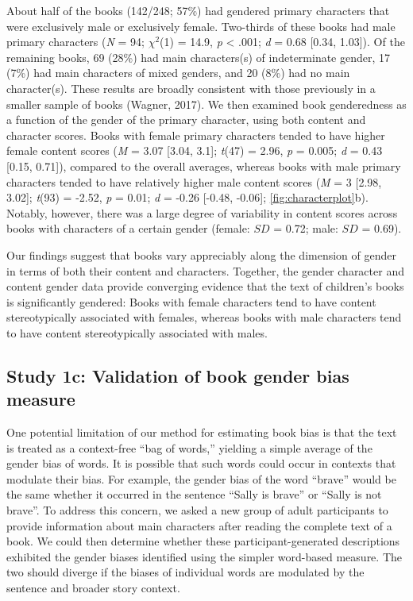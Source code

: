 \documentclass[
  english,
  ,man,floatsintext]{apa6}
\begin{document}
About half of the books (142/248; 57\%) had gendered primary characters that were exclusively male or exclusively female. Two-thirds of these books had male primary characters (\emph{N} = 94; \(\chi^2\)(1) = 14.9, \emph{p} \textless{} .001; \emph{d} = 0.68 {[}0.34, 1.03{]}). Of the remaining books, 69 (28\%) had main characters(s) of indeterminate gender, 17 (7\%) had main characters of mixed genders, and 20 (8\%) had no main character(s). These results are broadly consistent with those previously in a smaller sample of books (Wagner, 2017). We then examined book genderedness as a function of the gender of the primary character, using both content and character scores. Books with female primary characters tended to have higher female content scores (\emph{M} = 3.07 {[}3.04, 3.1{]}; \emph{t}(47) = 2.96, \emph{p} = 0.005; \emph{d} = 0.43 {[}0.15, 0.71{]}), compared to the overall averages, whereas books with male primary characters tended to have relatively higher male content scores (\emph{M} = 3 {[}2.98, 3.02{]}; \emph{t}(93) = -2.52, \emph{p} = 0.01; \emph{d} = -0.26 {[}-0.48, -0.06{]}; \autoref{fig:characterplot}b). Notably, however, there was a large degree of variability in content scores across books with characters of a certain gender (female: \(SD\) = 0.72; male: \(SD\) = 0.69).

Our findings suggest that books vary appreciably along the dimension of gender in terms of both their content and characters. Together, the gender character and content gender data provide converging evidence that the text of children's books is significantly gendered: Books with female characters tend to have content stereotypically associated with females, whereas books with male characters tend to have content stereotypically associated with males.

\hypertarget{study-1c-validation-of-book-gender-bias-measure}{%
\subsection{Study 1c: Validation of book gender bias measure}\label{study-1c-validation-of-book-gender-bias-measure}}

One potential limitation of our method for estimating book bias is that the text is treated as a context-free \enquote{bag of words,} yielding a simple average of the gender bias of words. It is possible that such words could occur in contexts that modulate their bias. For example, the gender bias of the word \enquote{brave} would be the same whether it occurred in the sentence \enquote{Sally is brave} or \enquote{Sally is not brave}. To address this concern, we asked a new group of adult participants to provide information about main characters after reading the complete text of a book. We could then determine whether these participant-generated descriptions exhibited the gender biases identified using the simpler word-based measure. The two should diverge if the biases of individual words are modulated by the sentence and broader story context.
\end{document}
